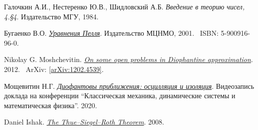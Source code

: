 \thispagestyle{supplementary}

\begin{thebibliography}{5}
        Галочкин А.И., Нестеренко Ю.В., Шидловский А.Б. 
        \textit{Введение в теорию чисел, 4.\S4}. 
        Издательство МГУ, 1984.

        Бугаенко В.О. 
        \href{https://www.mccme.ru/mmmf-lectures/books/books/book.13.pdf}{\textit{Уравнения Пелля}}. 
        Издательство МЦНМО, 2001.~\newline
        ISBN: 5-900916-96-0.

        Nikolay G. Moshchevitin. 
        \href{https://arxiv.org/pdf/1202.4539.pdf}{\textit{On some open problems in Diophantine approximation}}. 
        2012.~\newline
        ArXiv: \href{https://arxiv.org/abs/1202.4539}{[arXiv:1202.4539]}.

        Мощевитин Н.Г. 
        \href{http://www.mathnet.ru/present26192}{\textit{Диофантовы приближения: осцилляция и изоляция}}. 
        Видеозапись доклада на конференции ``Классическая механика, динамические системы и математическая физика''. 
        2020.

        Daniel Ishak. 
        \href{https://uu.diva-portal.org/smash/get/diva2:302893/FULLTEXT01.pdf}{\textit{The Thue--Siegel--Roth Theorem}}. 
        2008.
\end{thebibliography}
